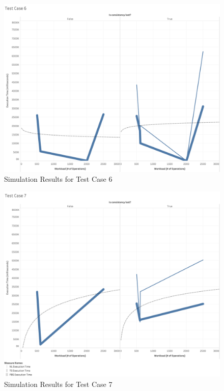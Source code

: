 \begin{figure}
\centering
\includegraphics[scale=0.20]{images/TestCase6(WL).png}
\caption{Simulation Results for Test Case 6}
\label{results:test_case_graphs_6}
\end{figure}

\begin{figure}
\centering
\includegraphics[scale=0.20]{images/TestCase7(WL).png}
\caption{Simulation Results for Test Case 7}
\label{results:test_case_graphs_7}
\end{figure}

